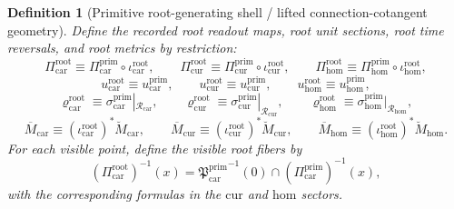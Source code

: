 \documentclass[11pt]{article}
\newcommand{\TensorRootSpace}{\mathcal R_{\mathrm{car}}}
\newcommand{\CurRootSpace}{\mathcal R_{\mathrm{cur}}}
\newcommand{\HomRootSpace}{\mathcal R_{\mathrm{hom}}}
\newcommand{\TensorRootRead}{\Pi_{\mathrm{car}}^{\mathrm{root}}}
\newcommand{\CurRootRead}{\Pi_{\mathrm{cur}}^{\mathrm{root}}}
\newcommand{\HomRootRead}{\Pi_{\mathrm{hom}}^{\mathrm{root}}}
\newcommand{\TensorRootUnit}{u_{\mathrm{car}}^{\mathrm{root}}}
\newcommand{\CurRootUnit}{u_{\mathrm{cur}}^{\mathrm{root}}}
\newcommand{\HomRootUnit}{u_{\mathrm{hom}}^{\mathrm{root}}}
\newcommand{\TensorRootTimeRev}{\varrho_{\mathrm{car}}^{\mathrm{root}}}
\newcommand{\CurRootTimeRev}{\varrho_{\mathrm{cur}}^{\mathrm{root}}}
\newcommand{\HomRootTimeRev}{\varrho_{\mathrm{hom}}^{\mathrm{root}}}
\newcommand{\TensorRootSpaceMetric}{\overline M_{\mathrm{car}}}
\newcommand{\CurRootSpaceMetric}{\overline M_{\mathrm{cur}}}
\newcommand{\HomRootSpaceMetric}{\overline M_{\mathrm{hom}}}
\newcommand{\TensorPrimitiveRead}{\Pi_{\mathrm{car}}^{\mathrm{prim}}}
\newcommand{\CurPrimitiveRead}{\Pi_{\mathrm{cur}}^{\mathrm{prim}}}
\newcommand{\HomPrimitiveRead}{\Pi_{\mathrm{hom}}^{\mathrm{prim}}}
\newcommand{\TensorPrimitiveUnit}{u_{\mathrm{car}}^{\mathrm{prim}}}
\newcommand{\CurPrimitiveUnit}{u_{\mathrm{cur}}^{\mathrm{prim}}}
\newcommand{\HomPrimitiveUnit}{u_{\mathrm{hom}}^{\mathrm{prim}}}
\newcommand{\TensorPrimitiveTimeRev}{\sigma_{\mathrm{car}}^{\mathrm{prim}}}
\newcommand{\CurPrimitiveTimeRev}{\sigma_{\mathrm{cur}}^{\mathrm{prim}}}
\newcommand{\HomPrimitiveTimeRev}{\sigma_{\mathrm{hom}}^{\mathrm{prim}}}
\newcommand{\TensorPrimitiveSpaceMetric}{\breve M_{\mathrm{car}}}
\newcommand{\CurPrimitiveSpaceMetric}{\breve M_{\mathrm{cur}}}
\newcommand{\HomPrimitiveSpaceMetric}{\breve M_{\mathrm{hom}}}
\newcommand{\TensorPrimitiveSection}{\mathfrak P_{\mathrm{car}}^{\mathrm{prim}}}
\newcommand{\TensorRootInc}{\iota_{\mathrm{car}}^{\mathrm{root}}}
\newcommand{\CurRootInc}{\iota_{\mathrm{cur}}^{\mathrm{root}}}
\newcommand{\HomRootInc}{\iota_{\mathrm{hom}}^{\mathrm{root}}}
\newtheorem{definition}{Definition}
\begin{document}
\begin{definition}[Primitive root-generating shell / lifted connection-cotangent geometry]
Define the recorded root readout maps, root unit sections, root time reversals, and root metrics by restriction:
\begin{equation}
\TensorRootRead\equiv\TensorPrimitiveRead\circ\TensorRootInc,\qquad
\CurRootRead\equiv\CurPrimitiveRead\circ\CurRootInc,\qquad
\HomRootRead\equiv\HomPrimitiveRead\circ\HomRootInc,
\label{eq:root_read_from_primitive}
\end{equation}
\begin{equation}
\TensorRootUnit\equiv\TensorPrimitiveUnit,\qquad
\CurRootUnit\equiv\CurPrimitiveUnit,\qquad
\HomRootUnit\equiv\HomPrimitiveUnit,
\label{eq:root_unit_from_primitive}
\end{equation}
\begin{equation}
\TensorRootTimeRev\equiv\TensorPrimitiveTimeRev|_{\TensorRootSpace},\qquad
\CurRootTimeRev\equiv\CurPrimitiveTimeRev|_{\CurRootSpace},\qquad
\HomRootTimeRev\equiv\HomPrimitiveTimeRev|_{\HomRootSpace},
\label{eq:root_time_rev_from_primitive}
\end{equation}
\begin{equation}
\TensorRootSpaceMetric\equiv(\TensorRootInc)^*\TensorPrimitiveSpaceMetric,\qquad
\CurRootSpaceMetric\equiv(\CurRootInc)^*\CurPrimitiveSpaceMetric,\qquad
\HomRootSpaceMetric\equiv(\HomRootInc)^*\HomPrimitiveSpaceMetric.
\label{eq:root_metric_from_primitive}
\end{equation}
For each visible point, define the visible root fibers by
\begin{equation}
(\TensorRootRead)^{-1}(x)
=
{\TensorPrimitiveSection}^{-1}(0)\cap(\TensorPrimitiveRead)^{-1}(x),
\label{eq:root_fiber_from_primitive_car}
\end{equation}
with the corresponding formulas in the \(\mathrm{cur}\) and \(\mathrm{hom}\) sectors.
\end{definition}
\end{document}
